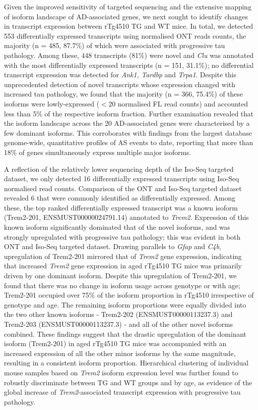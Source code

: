 Given the improved sensitivity of targeted sequencing and the extensive mapping of isoform landscape of AD-associated genes, we next sought to identify changes in transcript expression between rTg4510 TG and WT mice. In total, we detected 553 differentially expressed transcripts using normalised ONT reads counts, the majority (n = 485, 87.7\%) of which were associated with progressive tau pathology. Among these, 448 transcripts (81\%) were novel and \textit{Clu} was annotated with the most differentially expressed transcripts (n = 151, 31.1\%); no differential transcript expression was detected for \textit{Ank1, Tardbp} and \textit{Trpa1}. Despite this unprecedented detection of novel transcripts whose expression changed with increased tau pathology, we found that the majority (n = 366, 75.4\%) of these isoforms were lowly-expressed ($<$20 normalised FL read counts) and accounted less than 5\% of the respective isoform fraction. Further examination revealed that the isoform landscape across the 20 AD-associated genes were characterised by a few dominant isoforms. This corroborates with findings from the largest database genome-wide, quantitative profiles of AS events to date, reporting that more than 18\% of genes simultaneously express multiple major isoforms\cite{Tapial2017}. 

A reflection of the relatively lower sequencing depth of the Iso-Seq targeted dataset, we only detected 16 differentially expressed transcripts using Iso-Seq normalised read counts. Comparison of the ONT and Iso-Seq targeted dataset revealed 6 that were commonly identified as differentially expressed. Among these, the top ranked differentially expressed transcript was a known isoform (Trem2-201, ENSMUST00000024791.14) annotated to \textit{Trem2}. Expression of this known isoform significantly dominated that of the novel isoforms, and was strongly upregulated with progressive tau pathology; this was evident in both ONT and Iso-Seq targeted dataset. Drawing parallels to \textit{Gfap} and \textit{C4b}, upregulation of Trem2-201 mirrored that of \textit{Trem2} gene expression, indicating that increased \textit{Trem2} gene expression in aged rTg4510 TG mice was primarily driven by one dominant isoform. Despite this upregulation of Trem2-201, we found that there was no change in isoform usage across genotype or with age; Trem2-201 occupied over 75\% of the isoform proportion in rTg4510 irrespective of genotype and age. The remaining isoform proportions were equally divided into the two other known isoforms - Trem2-202 (ENSMUST00000113237.3) and Trem2-203 (ENSMUST00000113237.3) - and all of the other novel isoforms combined. These findings suggest that the drastic upregulation of the dominant isoform (Trem2-201) in aged rTg4510 TG mice was accompanied with an increased expression of all the other minor isoforms by the same magnitude, resulting in a consistent isoform proportion. Hierarchical clustering of individual mouse samples based on \textit{Trem2} isoform expression level was further found to robustly discriminate between TG and WT groups and by age, as evidence of the global increase of \textit{Trem2}-associated transcript expression with progressive tau pathology.  

